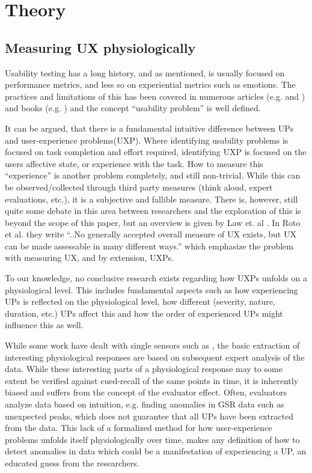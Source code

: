 \section{Theory}

\subsection{Measuring UX physiologically}
Usability testing has a long history, and as mentioned, is usually focused on performance metrics, and less so
on experiential metrics such as emotions.  The practices and limitations of this has been covered in numerous articles
(e.g. \cite{usability_eval} and \cite{eval_effect}) and books (e.g. \cite{guide_to_upeval}) and the concept ``usability
problem'' is well defined.

It can be argued, that there is a fundamental intuitive difference between UPs and user-experience problems(UXP).  Where
identifying usability problems is focused on task completion and effort required, identifying UXP is focused on the
users affective state, or experience with the task.  How to measure this ``experience'' is another problem completely,
and still non-trivial. While this can be observed/collected through third party measures
(think aloud, expert evaluations, etc.), it is a subjective and fallible measure.  There is, however,
still quite some debate in this area between researchers and the exploration of this is beyond the scope of this paper,
but an overview is given by Law et. al \cite{attitudes_ux_measure}.  In Roto et al. \cite{what_is_ux} they write ``..No
generally accepted overall measure of UX exists, but UX can be made assessable in many different ways.'' which 
emphasize the problem with measuring UX, and by extension, UXPs.

To our knowledge, no conclusive research exists regarding how UXPs unfolds on a physiological level. This includes
fundamental aspects such as how experiencing UPs is reflected on the physiological level, how different (severity, nature,
duration, etc.) UPs affect this and how the order of experienced UPs might influence this as well.

While some work have dealt with single sensors such as \cite{mind_the_gap} \cite{LH-paper}, the basic extraction of
interesting physiological responses are based on subsequent expert analysis of the data.  While these interesting parts
of a physiological response may to some extent be verified against cued-recall of the same points in time, it is
inherently biased and suffers from the concept of the evaluator effect. Often, evaluators analyze data based on
intuition, e.g. finding anomalies in GSR data such as unexpected peaks, which does not guarantee that all UPs have been
extracted from the data.  This lack of a formalized method for how user-experience problems unfolds itself
physiologically over time, makes any definition of how to detect anomalies in data which could be a manifestation of
experiencing a UP, an educated guess from the researchers.

